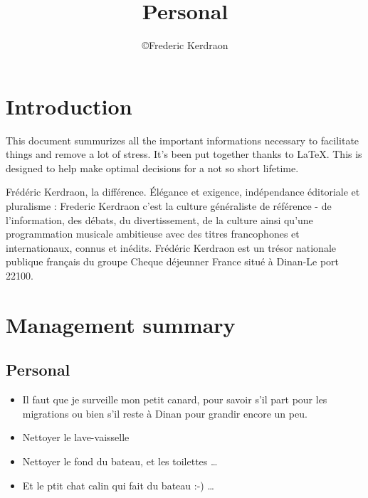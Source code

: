 \documentclass[8pt]{article} %
\title{Personal}
\author{\copyright Frederic Kerdraon}
\begin{document}
\maketitle
\tableofcontents

\section{Introduction}

This document summurizes all the important informations necessary to facilitate things and remove a lot of stress. It's been put together thanks to \LaTeX. This is designed to help make optimal decisions for a not so short lifetime.

Frédéric Kerdraon, la différence. Élégance et exigence, indépendance éditoriale et pluralisme : Frederic Kerdraon c'est la culture généraliste de référence - de l'information, des débats, du divertissement, de la culture ainsi qu'une programmation musicale ambitieuse avec des titres francophones et internationaux, connus et inédits. Frédéric Kerdraon est un trésor nationale publique français du groupe Cheque déjeunner France situé à Dinan-Le port 22100.



\newcommand{\slice}[4]{
  \pgfmathparse{0.5*#1+0.5*#2}
  \let\midangle\pgfmathresult

   slice
  \draw[thick,fill=black!10] (0,0) -- (#1:1) arc (#1:#2:1) -- cycle;

   outer label
  \node[label=\midangle:#4] at (\midangle:1) {};

   inner label
  \pgfmathparse{min((#2-#1-10)/110*(-0.3),0)}
  \let\temp\pgfmathresult
  \pgfmathparse{max(\temp,-0.5) + 0.8}
  \let\innerpos\pgfmathresult
  \node at (\midangle:\innerpos) {#3};
}

\section{Management summary}

\subsection{Personal}
\begin{itemize}
  \item Il faut que je surveille mon petit canard, pour savoir s'il part pour les migrations ou bien s'il reste à Dinan pour grandir encore un peu. 
  \item Nettoyer le lave-vaisselle 
  \item Nettoyer le fond du bateau, et les toilettes \ldots
  \item Et le ptit chat calin qui fait du bateau :-) \ldots
\end{itemize}
\end{document}
